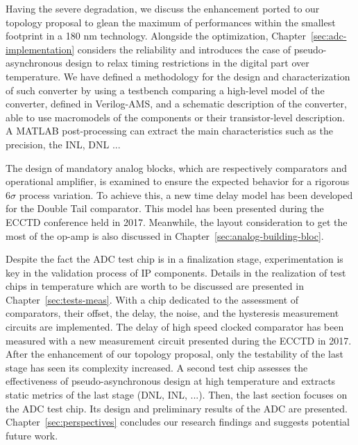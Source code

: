 Having the severe degradation, we discuss the enhancement ported to our topology proposal to glean the maximum of performances within the smallest footprint in a 180 nm technology. Alongside the optimization, Chapter~\ref{sec:adc-implementation} considers the reliability and introduces the case of pseudo-asynchronous design to relax timing restrictions in the digital part over temperature. We have defined a methodology for the design and characterization of such converter by using a testbench comparing a high-level model of the converter, defined in Verilog-AMS, and a schematic description of the converter, able to use macromodels of the components or their transistor-level description. A MATLAB post-processing can extract the main characteristics such as the precision, the INL, DNL ...

The design of mandatory analog blocks, which are respectively comparators and operational amplifier, is examined to ensure the expected behavior for a rigorous 6\(\sigma\) process variation. To achieve this, a new time delay model has been developed for the Double Tail comparator. This model has been presented during the ECCTD conference held in 2017. Meanwhile, the layout consideration to get the most of the op-amp is also discussed in Chapter~\ref{sec:analog-building-bloc}.

Despite the fact the ADC test chip is in a finalization stage, experimentation is key in the validation process of IP components. Details in the realization of test chips in temperature which are worth to be discussed are presented in Chapter~\ref{sec:tests-meas}. With a chip dedicated to the assessment of comparators, their offset, the delay, the noise, and the hysteresis measurement circuits are implemented. The delay of high speed clocked comparator has been measured with a new measurement circuit presented during the ECCTD in 2017. After the enhancement of our topology proposal, only the testability of the last stage has seen its complexity increased. A second test chip assesses the effectiveness of pseudo-asynchronous design at high temperature and extracts static metrics of the last stage (DNL, INL, ...). Then, the last section focuses on the ADC test chip. Its design and preliminary results of the ADC are presented. Chapter~\ref{sec:perspectives} concludes our research findings and suggests potential future work.
